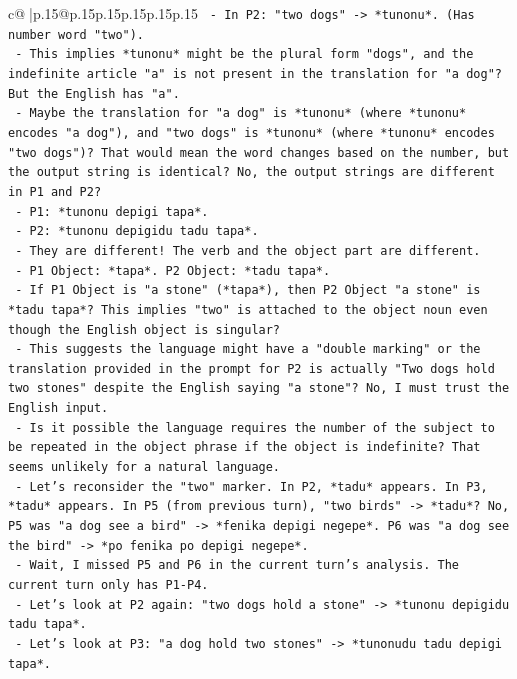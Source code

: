 \documentclass{article}
\begin{document}
{\begin{supertabular}{c@{$\;$}|p{.15\linewidth}@{}p{.15\linewidth}p{.15\linewidth}p{.15\linewidth}p{.15\linewidth}p{.15\linewidth}}
{{{\texttt{        {-} In P2: "two dogs" {-}> *tunonu*. (Has number word "two").} \\
\texttt{        {-} This implies *tunonu* might be the plural form "dogs", and the indefinite article "a" is not present in the translation for "a dog"? But the English has "a".} \\
\texttt{        {-} Maybe the translation for "a dog" is *tunonu* (where *tunonu* encodes "a dog"), and "two dogs" is *tunonu* (where *tunonu* encodes "two dogs")? That would mean the word changes based on the number, but the output string is identical? No, the output strings are different in P1 and P2?} \\
\texttt{        {-} P1: *tunonu depigi tapa*.} \\
\texttt{        {-} P2: *tunonu depigidu tadu tapa*.} \\
\texttt{        {-} They are different! The verb and the object part are different.} \\
\texttt{        {-} P1 Object: *tapa*. P2 Object: *tadu tapa*.} \\
\texttt{        {-} If P1 Object is "a stone" (*tapa*), then P2 Object "a stone" is *tadu tapa*? This implies "two" is attached to the object noun even though the English object is singular?} \\
\texttt{        {-} This suggests the language might have a "double marking" or the translation provided in the prompt for P2 is actually "Two dogs hold two stones" despite the English saying "a stone"? No, I must trust the English input.} \\
\texttt{        {-} Is it possible the language requires the number of the subject to be repeated in the object phrase if the object is indefinite? That seems unlikely for a natural language.} \\
\texttt{        {-} Let's reconsider the "two" marker. In P2, *tadu* appears. In P3, *tadu* appears. In P5 (from previous turn), "two birds" {-}> *tadu*? No, P5 was "a dog see a bird" {-}> *fenika depigi negepe*. P6 was "a dog see the bird" {-}> *po fenika po depigi negepe*.} \\
\texttt{        {-} Wait, I missed P5 and P6 in the current turn's analysis. The current turn only has P1{-}P4.} \\
\texttt{        {-} Let's look at P2 again: "two dogs hold a stone" {-}> *tunonu depigidu tadu tapa*.} \\
\texttt{        {-} Let's look at P3: "a dog hold two stones" {-}> *tunonudu tadu depigi tapa*.} \\
}}}
\end{supertabular}}
\end{document}
